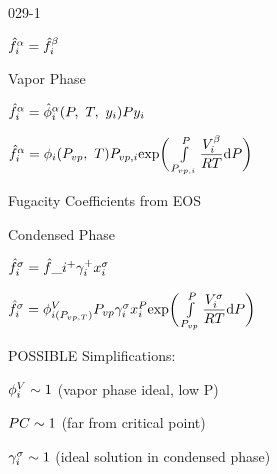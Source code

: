\begin{mitframe}{029-1}

        
\begin{listone}
	\item$\hat{\fug}_{\state}^{\tdiff}=\hat{\fug}_{\state}^{\texpcoeff}$
\item Vapor Phase
	\begin{listtwo}
              \item $\hat{\fug}_{\state}^{\tdiff}=\hat{\eleccoeff}_{\state}^{\tdiff}(\p,~\Temp,~y_{\state})\p{y}_{\state}$
             
              \item $\hat{\fug}_{\state}^{\tdiff}=\eleccoeff_{\state}(\p_{vp},~\Temp)\p_{vp,\state}\text{exp}\bigg(\int\limits_{\p_{vp,\state}}^{\p}\dfrac{\vol_{\state}^{\texpcoeff}}{\gasconst\Temp}\mathrm{d}\p\bigg)$
              
               			\begin{listthree}
                        \item Fugacity Coefficients from EOS
                        \end{listthree}            


			\end{listtwo}
\item Condensed Phase
	\begin{listtwo}

        	\item $\hat{\fug}_{\state}^{\molecrad}=\hat{\fug}\_{\state}^{+}\actcoeff^{+}\specfrac{i}^{\molecrad}$
            \item $\hat{\fug}_{\state}^{\molecrad}=\eleccoeff_{\state(\p_{vp, \Temp})}^{\vol}\p_{vp}\actcoeff^{\molecrad}\specfrac{i}^{\p}\text{exp}\bigg(\int\limits_{\p_{vp}}^{\p}\dfrac{\vol_{\state}^{\molecrad}}{\gasconst\Temp}\mathrm{d}\p\bigg)$
            
            			\begin{listthree}
                        \item POSSIBLE Simplifications:
                        
                        		\begin{listfour}
                                \item $\eleccoeff_{\state}^{\vol}\sim{1}$  (vapor phase ideal, low P)
                                \item $\p\conc\sim{1}$ (far from critical point)
                                \item$\actcoeff^{\molecrad}\sim{1}$ (ideal solution in condensed phase)
                                
								\end{listfour}
						\end{listthree}
	\end{listtwo}
\end{listone}

\end{mitframe}